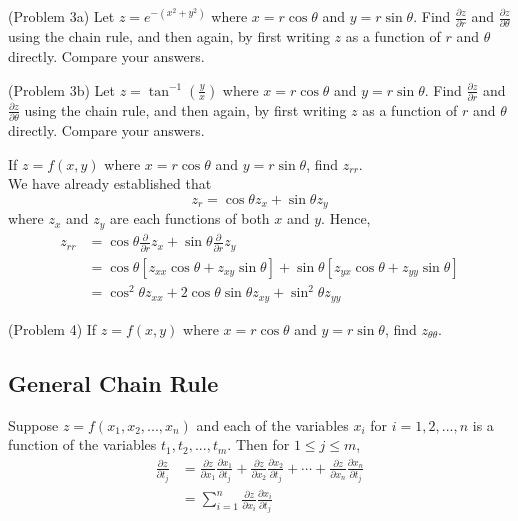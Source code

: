 \documentclass[handout]{ximera}
\begin{document}
\begin{problem}(Problem 3a)
Let $z = e^{-(x^2 + y^2)}$ where $x = r\cos \theta$ and $y = r\sin \theta$.  
Find $\frac{\partial z}{\partial r}$ and $\frac{\partial z}{\partial \theta}$ using the chain rule, 
and then again, by first writing $z$ as a function of $r$ and $\theta$ directly. Compare your answers.
\end{problem}

\begin{problem}(Problem 3b)
Let $z = \tan^{-1}\left(\frac{y}{x}\right)$ where $x = r\cos \theta$ and $y = r\sin \theta$.  
Find $\frac{\partial z}{\partial r}$ and $\frac{\partial z}{\partial \theta}$ using the chain rule, and then again, 
by first writing $z$ as a function of $r$ and $\theta$ directly.
Compare your answers.
\end{problem}





\begin{example}[Example 4]
If $z = f(x,y)$ where $x = r\cos \theta$ and $y = r \sin \theta$, find $z_{rr}$.\\
We have already established that
\[
z_r = \cos \theta z_x + \sin \theta z_y
\]
where $z_x$ and $z_y$ are each functions of both $x$ and $y$. Hence,
\begin{align*}
z_{rr} &= \cos \theta \frac{\partial}{\partial r} z_x + \sin \theta \frac{\partial}{\partial r} z_y\\
       &= \cos \theta \left[z_{xx}\cos \theta + z_{xy} \sin \theta \right] + 
       \sin \theta \left[ z_{yx} \cos \theta + z_{yy} \sin \theta  \right]\\
       &= \cos^2 \theta z_{xx} + 2\cos \theta \sin \theta z_{xy} + \sin^2 \theta z_{yy}
\end{align*}
\end{example}

\begin{problem}(Problem 4) 
If $z = f(x,y)$ where $x = r\cos \theta$ and $y = r \sin \theta$, find $z_{\theta \theta}$.
\end{problem}
       
\subsection{General Chain Rule}
Suppose $z = f(x_1, x_2, ..., x_n)$ and each of the variables $x_i$ for $i = 1, 2, ..., n$ is a function of the variables
$t_1, t_2,..., t_m$. Then for $1 \leq j \leq m$,
\begin{align*}
\frac{\partial z}{\partial t_j} &= \frac{\partial z}{\partial x_1}\frac{\partial x_1}{\partial t_j} 
                     + \frac{\partial z}{\partial x_2}\frac{\partial x_2}{\partial t_j} + \cdots + \frac{\partial z}{\partial x_n}\frac{\partial x_n}{\partial t_j}\\
                               &= \sum_{i = 1}^n \frac{\partial z}{\partial x_i}\frac{\partial x_i}{\partial t_j}
\end{align*}
\end{document}
